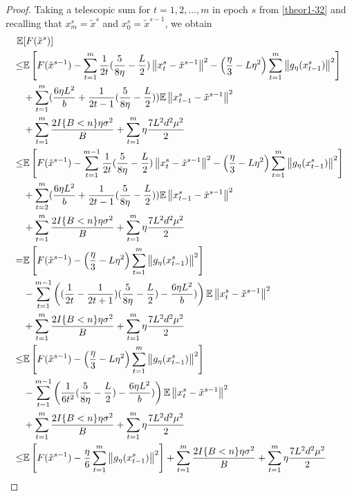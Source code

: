 \documentclass{article}
\newcommand*{\E}{\mathbb{E}}
\newcommand{\norm}[1]{\left\lVert#1\right\rVert}
\theoremstyle{definition}
\theoremstyle{remark}
\begin{document}
\begin{proof}
Taking a telescopic sum for $t = 1, 2, \ldots, m$ in epoch $s$ from \eqref{theor1-32} and recalling that $x_m^s = \tilde{x}^s$ and $x_0^s = \tilde{x}^{s-1}$, we obtain
 \begin{align} 
\E&[F(\tilde{x}^s)] \notag
\\ \leq& \E\left[F(\tilde{x}^{s-1})  -\sum_{t=1}^m\frac{1}{2t}(\frac{5}{8\eta} - \frac{L}{2})\norm{{x}_t^s-\tilde{x}^{s-1}}^2- \left(\frac{\eta}{3}-L\eta^2\right)\sum_{t=1}^m\norm{g_{\eta}(x_{t-1}^s)}^2\right]\notag\\
&+\sum_{t=1}^m(\frac{6\eta L^2}{b}+\frac{1}{2t-1}(\frac{5}{8\eta} - \frac{L}{2}))\E\norm{x_{t-1}^s-\tilde{x}^{s-1}}^2\notag\\
&+ \sum_{t=1}^m \frac{2I\{B < n\}\eta \sigma ^2}{B}+\sum_{t=1}^m \eta \frac{7L^2 d^2 \mu^2}{2}\notag\\
\leq& \E\left[F(\tilde{x}^{s-1})  -\sum_{t=1}^{m-1}\frac{1}{2t}(\frac{5}{8\eta} - \frac{L}{2})\norm{{x}_t^s-\tilde{x}^{s-1}}^2- \left(\frac{\eta}{3}-L\eta^2\right)\sum_{t=1}^m\norm{g_{\eta}(x_{t-1}^s)}^2\right]\notag\\
&+\sum_{t=2}^m(\frac{6\eta L^2}{b}+\frac{1}{2t-1}(\frac{5}{8\eta} - \frac{L}{2}))\E\norm{x_{t-1}^s-\tilde{x}^{s-1}}^2\notag\\
&+ \sum_{t=1}^m \frac{2I\{B < n\}\eta \sigma ^2}{B}+\sum_{t=1}^m \eta \frac{7L^2 d^2 \mu^2}{2}\label{theor1-34}
\\
=& \E\left[F(\tilde{x}^{s-1}) - \left(\frac{\eta}{3}-L\eta^2\right)\sum_{t=1}^m\norm{g_{\eta}(x_{t-1}^s)}^2\right]\notag\\
&-\sum_{t=1}^{m-1}\left((\frac{1}{2t} - \frac{1}{2t+1})(\frac{5}{8\eta} - \frac{L}{2})-\frac{6\eta L^2 }{b})\right)\E\norm{x_{t}^s-\tilde{x}^{s-1}}^2\notag\\
&+ \sum_{t=1}^m \frac{2I\{B < n\}\eta \sigma ^2}{B}+\sum_{t=1}^m \eta \frac{7 L^2 d^2 \mu^2}{2}\notag\\
\leq& \E\left[F(\tilde{x}^{s-1}) - \left(\frac{\eta}{3}-L\eta^2\right)\sum_{t=1}^m\norm{g_{\eta}(x_{t-1}^s)}^2\right]\notag\\
&-\sum_{t=1}^{m-1}\left(\frac{1}{6t^2}(\frac{5}{8\eta} - \frac{L}{2})-\frac{6\eta L^2 }{b})\right)\E\norm{x_{t}^s-\tilde{x}^{s-1}}^2\notag\\
&+ \sum_{t=1}^m \frac{2I\{B < n\}\eta \sigma ^2}{B}+\sum_{t=1}^m \eta \frac{7 L^2 d^2 \mu^2}{2}\notag\\
\leq& \E\left[F(\tilde{x}^{s-1}) - \frac{\eta}{6}\sum_{t=1}^m\norm{g_{\eta}(x_{t-1}^s)}^2\right]+ \sum_{t=1}^m \frac{2I\{B < n\}\eta \sigma ^2}{B}+\sum_{t=1}^m \eta \frac{7 L^2 d^2 \mu^2}{2}\label{theor1-35}

\end{align}
\end{proof}
\end{document}
